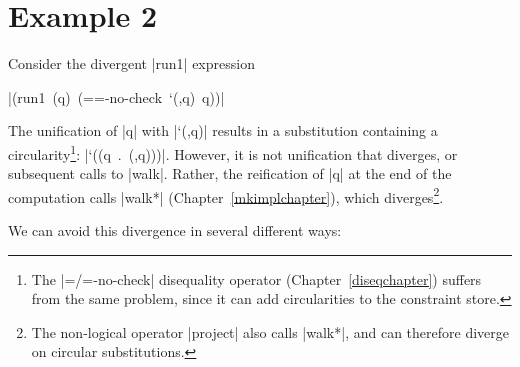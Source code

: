 \section*{Example 2}

Consider the divergent \scheme|run1| expression

\wspace

\mbox{\scheme|(run1 (q) (==-no-check `(,q) q))|}

\wspace

\noindent The unification of \scheme|q| with \scheme|`(,q)| results in
a substitution containing a circularity\footnote{The \scheme|=/=-no-check|
disequality operator (Chapter~\ref{diseqchapter}) suffers from the
same problem, since it can add circularities to the constraint
store.}: \mbox{\scheme|`((q . (,q)))|}.  However, it is not
unification that diverges, or subsequent calls to \scheme|walk|.
Rather, the reification of \scheme|q| at the end of the computation
calls \scheme|walk*| (Chapter~\ref{mkimplchapter}), which
diverges\footnote{The non-logical operator \scheme|project| also calls
\scheme|walk*|, and can therefore diverge on circular substitutions.}.

We can avoid this divergence in several different ways:

